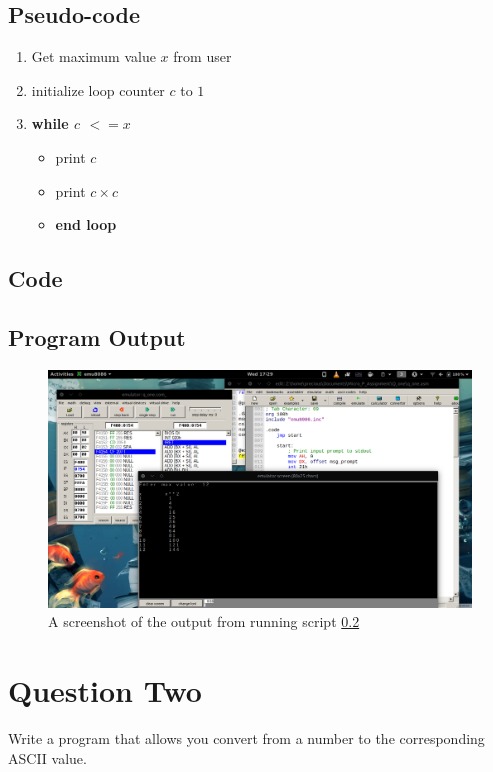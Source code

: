 \documentclass[]{article}
\begin{document}
\subsection{Pseudo-code}
\begin{enumerate}
	\item Get maximum value $x$ from user
	\item initialize loop counter $c$ to $1$
	\item \textbf{while $c $ $<= x$ }
	\begin{itemize}
		\item print $c$
		\item print $c \times c$
		\item \textbf{end loop}
	\end{itemize}
\end{enumerate}

\subsection{Code} \label{script 1}
\begin{flushleft}
	
\end{flushleft}

\clearpage
\subsection{Program Output}

\begin{figure}[h]
	\includegraphics[width=15cm]{Q_one/q1_updated_aug26.png}
	\centering
	\caption{A screenshot of the output from running script \ref{script 1}
	}
\end{figure}



\newpage
\clearpage
\section{Question Two}
Write a program that allows you convert from a number to the corresponding ASCII value.
\end{document}
